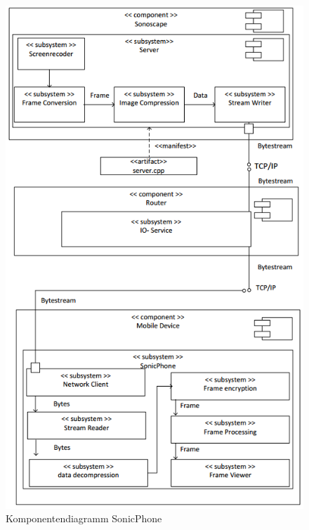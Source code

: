 \begin{figure}[H] 
\centering
\includegraphics[width=1\textwidth, height = 1\textheight]{Bilder/objektorientierteAnalyseundEntwurf/KD_Komponentendiagramm}
\caption{{\small Komponentendiagramm SonicPhone}}
\label{fig:Komponentendiagramm}
\end{figure}

